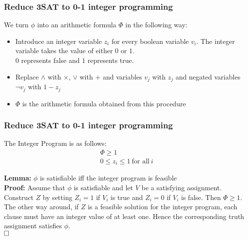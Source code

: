 \documentclass[mathserif]{beamer}
\renewcommand{\qed}{\hfill\square}
\begin{document}
\begin{frame}
\frametitle{Reduce 3SAT to 0-1 integer programming}
We turn $\phi$ into an arithmetic formula $\Phi$ in the following way:
\begin{itemize}
\item Introduce an integer variable $z_i$ for every boolean variable $v_i$. The
integer variable takes the value of either $0$ or $1$.\\$0$ represents false and
$1$ represents true.
\item Replace $\wedge$ with $\times$, $\vee$ with $+$ and variables $v_j$ with
	$z_j$ and negated variables $\neg v_j$ with $1 - z_j$
\item $\Phi$ is the arithmetic formula obtained from this procedure
\end{itemize}
\end{frame}

\begin{frame}
\frametitle{Reduce 3SAT to 0-1 integer programming}
The Integer Program is as follows:
\begin{align*}
\Phi \geq 1\\
0 \leq z_i \leq 1\ \text{for all}\ i
\end{align*}

\textbf{Lemma:} $\phi$ is satisfiable iff the integer program is feasible\\
\textbf{Proof:} Assume that $\phi$ is satisfiable and let $V$ be a satisfying
assignment. Construct $Z$ by setting $Z_i = 1$ if $V_i$ is true and
$Z_i = 0$ if $V_i$ is false. Then $\Phi \geq 1$.\\
The other way around, if $Z$ is a feasible solution for the integer program,
each clause must have an integer value of at least one. Hence the corresponding
truth assignment satisfies $\phi$.\\
$\qed$
\end{frame}
\end{document}
